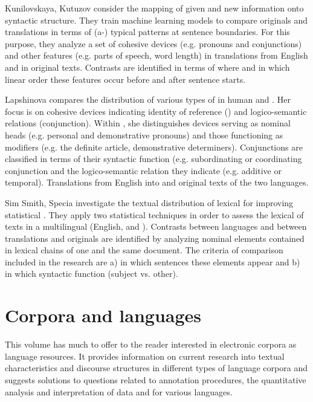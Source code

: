 \documentclass[output=paper]{langsci/langscibook.cls}
\begin{document}
Kunilovskaya, Kutuzov consider the mapping of given and new information onto syntactic structure. They train machine learning models to compare originals and translations in terms of (a-) typical patterns at sentence boundaries. For this purpose, they analyze a set of cohesive devices (e.g. pronouns and conjunctions) and other features (e.g. parts of speech, word length) in  translations from English and in  original texts. Contrasts are identified in terms of where and in which linear order these features occur before and after sentence starts. 

Lapshinova compares the distribution of various types of  in human and . Her focus is on cohesive devices indicating identity of reference () and logico-semantic relations (conjunction). Within , she distinguishes devices serving as nominal heads (e.g. personal and demonstrative pronouns) and those functioning as modifiers (e.g. the definite article, demonstrative determiners). Conjunctions are classified in terms of their syntactic function (e.g. subordinating or coordinating conjunction and the logico-semantic relation they indicate (e.g. additive or temporal). Translations from English into  and original texts of the two languages. 

\largerpage
Sim Smith, Specia investigate the textual distribution of lexical  for improving statistical . They apply two statistical techniques in order to assess the lexical  of texts in a multilingual  (English,  and ). Contrasts between languages and between translations and originals are identified by analyzing nominal elements contained in lexical chains of one and the same document. The criteria of comparison included in the research are a) in which sentences these elements appear and b) in which syntactic function (subject vs. other).
	
	\section{Corpora and languages}
	This volume has much to offer to the reader interested in electronic corpora as language resources. It provides information on current research into textual characteristics and discourse structures in different types of language corpora and suggests solutions to questions related to annotation procedures, the quantitative analysis and interpretation of data and  for various languages.
	
\end{document}
